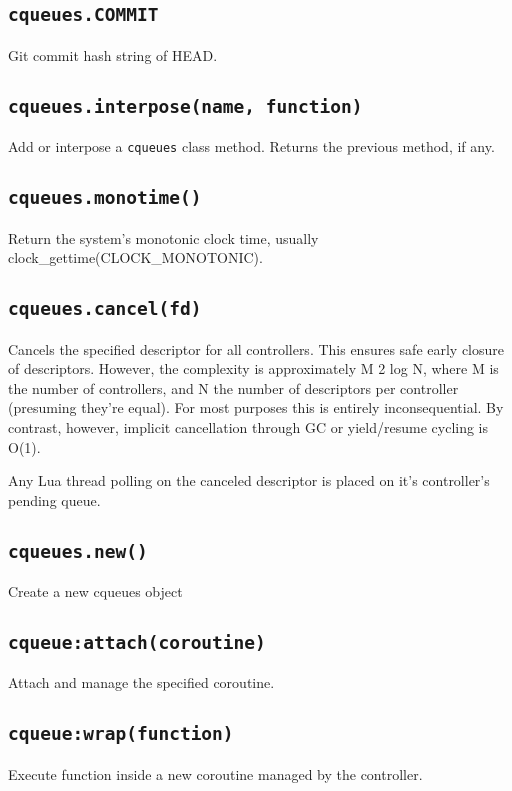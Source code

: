 \documentclass[11pt, oneside]{memoir}
\newcommand*{\cqueues}[0]{\texttt{cqueues}\xspace}
\newcommand*{\routine}[1]{\texttt{#1}\xspace}
\begin{document}
\subsection{\routine{cqueues.COMMIT}}
Git commit hash string of HEAD.

\subsection[\routine{cqueues.interpose}]{\routine{cqueues.interpose(name, function)}}
Add or interpose a \cqueues class method. Returns the previous method, if any.

\subsection[\routine{cqueues.monotime}]{\routine{cqueues.monotime()}}
Return the system's monotonic clock time, usually clock\_gettime(CLOCK\_MONOTONIC).

\subsection[\routine{cqueues.cancel}]{\routine{cqueues.cancel(fd)}}
Cancels the specified descriptor for all controllers. This ensures safe early closure of descriptors. However, the complexity is approximately M 2 log N, where M is the number of controllers, and N the number of descriptors per controller (presuming they're equal). For most purposes this is entirely inconsequential. By contrast, however, implicit cancellation through GC or yield/resume cycling is O(1).

Any Lua thread polling on the canceled descriptor is placed on it's controller's pending queue.

\subsection[\routine{cqueues.new}]{\routine{cqueues.new()}}
Create a new cqueues object

\subsection[\routine{cqueues:attach}]{\routine{cqueue:attach(coroutine)}}
Attach and manage the specified coroutine.

\subsection[\routine{cqueues:wrap}]{\routine{cqueue:wrap(function)}}
        Execute function inside a new coroutine managed by the controller.
\end{document}
